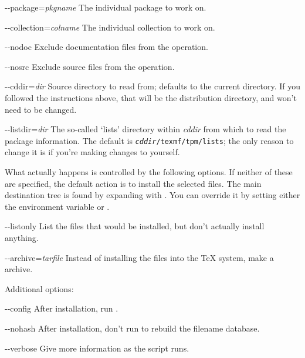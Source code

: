 \documentclass{article}
\begin{document}
\begin{ttdescription}
\item [-{}-package=\emph{pkgname}] The individual package to work on.

\item [-{}-collection=\emph{colname}] The individual collection to work on.

\item [-{}-nodoc] Exclude documentation files from the operation.

\item [-{}-nosrc] Exclude source files from the operation.

\item [-{}-cddir=\emph{dir}] Source directory to read from; defaults
to the current directory.  If you followed the instructions above, that
will be the distribution directory, and won't need to be changed.

\item [-{}-listdir=\emph{dir}] The so-called `lists' directory within
\emph{cddir} from which to read the package information.  The default is
\texttt{\emph{cddir}/texmf/tpm/lists}; the only reason to change it is
if you're making changes to \TeXLive{} yourself.

\end{ttdescription}

What actually happens is controlled by the following options.  If
neither of these are specified, the default action is to install the
selected files.  The main destination tree is found by expanding
 with .  You can override it by
setting either the environment variable  or
.

\begin{ttdescription}
\item [-{}-listonly] List the files that would be installed, but don't
actually install anything.

\item [-{}-archive=\emph{tarfile}] Instead of installing the files into
the \TeX{} system, make a  archive.

\end{ttdescription}

Additional options:

\begin{ttdescription}

\item [-{}-config] After installation, run .

\item [-{}-nohash] After installation, don't run  to
rebuild the filename database.

\item [-{}-verbose] Give more information as the script runs.

\end{ttdescription}
\end{document}
